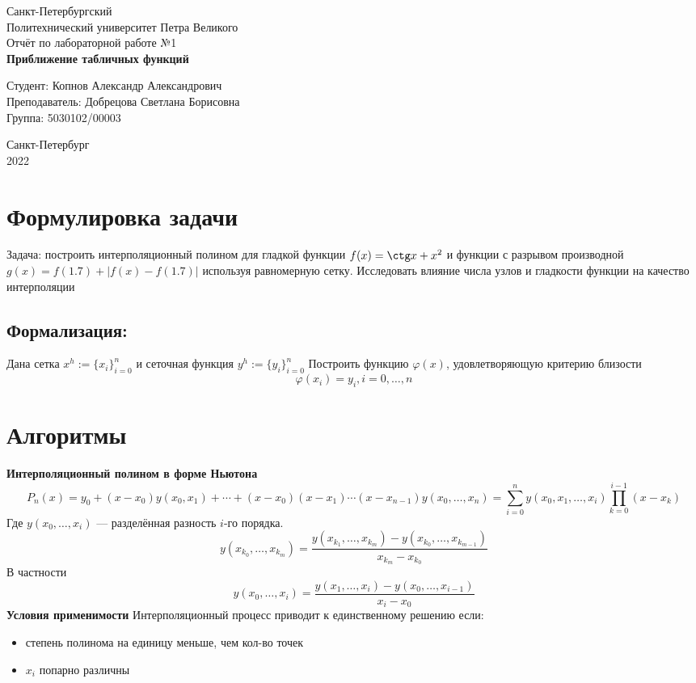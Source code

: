 \documentclass[a4paper]{article}
\begin{document}
\begin{titlepage}
  \Large
  \begin{center}
    Санкт-Петербургский\\
    Политехнический университет Петра Великого\\
    \vspace{10em}
    Отчёт по лабораторной работе №1\\
    \vspace{2em}
    \textbf{Приближение табличных функций}
  \end{center}
  \vspace{6em}
  \begin{flushright}
    Студент: Копнов Александр Александрович\\
    Преподаватель: Добрецова Светлана Борисовна\\
    Группа: 5030102/00003
  \end{flushright}
  \vspace{\fill}
  \begin{center}
    Санкт-Петербург\\
    2022
  \end{center}
\end{titlepage}
\tableofcontents
\pagebreak

\section{Формулировка задачи}
Задача: построить интерполяционный полином для гладкой функции $f(x) = \ctg x + x^{2}$ и функции с разрывом производной $g(x) = f(1.7) + |f(x) - f(1.7)|$ используя равномерную сетку. Исследовать влияние числа узлов и гладкости функции на качество интерполяции
\subsection{Формализация:}
Дана сетка $x^{h} := \{x_{i}\}_{i=0}^{n}$ и сеточная функция $y^{h}:=\{y_{i}\}_{i=0}^{n}$
Построить функцию $\varphi(x)$, удовлетворяющую критерию близости \[
  \varphi(x_{i}) = y_{i}, i=0,\ldots,n
\]
\section{Алгоритмы}
\textbf{Интерполяционный полином в форме Ньютона}
\[
  P_{n}(x) = y_{0} + (x-x_{0})y(x_{0},x_{1}) + \cdots + (x-x_{0})(x-x_{1})\cdots(x-x_{n-1})y(x_{0},\ldots,x_{n}) = \sum_{i=0}^n y(x_{0},x_{1},\ldots,x_{i}) \prod_{k=0}^{i-1} (x-x_{k})
\]
Где $y(x_{0},\ldots,x_{i})$ --- разделённая разность $i$-го порядка. \[
  y(x_{k_{0}},\ldots,x_{k_{m}}) = \frac{y(x_{k_{1}},\ldots,x_{k_{m}}) - y(x_{k_{0}},\ldots,x_{k_{m-1}})}{x_{k_{m}}-x_{k_{0}}}
\] В частности \[
  y(x_{0},\ldots,x_{i}) = \frac{y(x_{1},\ldots,x_{i}) - y(x_{0},\ldots,x_{i-1})}{x_{i}-x_{0}}
\]
\textbf{Условия применимости}
Интерполяционный процесс приводит к единственному решению если:
\begin{itemize}
  \item степень полинома на единицу меньше, чем кол-во точек
  \item $x_{i}$ попарно различны
\end{itemize}
\end{document}
